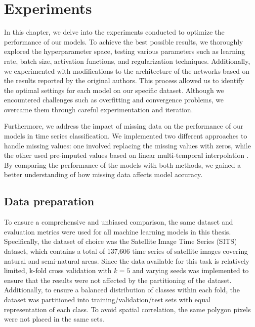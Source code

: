 \chapter{Experiments}

In this chapter, we delve into the experiments conducted to optimize the performance of our models.
To achieve the best possible results, we thoroughly explored the hyperparameter space, testing various parameters such as learning rate, batch size, activation functions, and regularization techniques.
Additionally, we experimented with modifications to the architecture of the networks based on the results reported by the original authors.
This process allowed us to identify the optimal settings for each model on our specific dataset. 
Although we encountered challenges such as overfitting and convergence problems, we overcame them through careful experimentation and iteration.

Furthermore, we address the impact of missing data on the performance of our models in time series classification.
We implemented two different approaches to handle missing values: one involved replacing the missing values with zeros, while the other used pre-imputed values based on linear multi-temporal interpolation \cite{IENCO201911}.
By comparing the performance of the models with both methods, we gained a better understanding of how missing data affects model accuracy.




\section{Data preparation}

To ensure a comprehensive and unbiased comparison, the same dataset and evaluation metrics were used for all machine learning models in this thesis. 
Specifically, the dataset of choice was the Satellite Image Time Series (SITS) dataset, which contains a total of 137,606 time series of satellite images covering natural and semi-natural areas. 
Since the data available for this task is relatively limited, k-fold cross validation with $k=5$ and varying seeds was implemented to ensure that the results were not affected by the partitioning of the dataset.
Additionally, to ensure a balanced distribution of classes within each fold, the dataset was partitioned into training/validation/test sets with equal representation of each class. 
To avoid spatial correlation, the same polygon pixels were not placed in the same sets.


